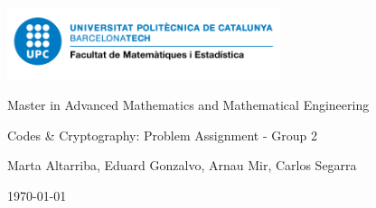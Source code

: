 \documentclass[a4paper, 10pt]{article}
\theoremstyle{definition} %
\begin{document}
\onehalfspacing
\pagestyle{empty}

\begin{center}
    \vspace{2cm}
    \includegraphics[width=8cm]{img/logo_fme.png}
    \vspace{2cm}

    \Large
    Master in Advanced Mathematics and Mathematical Engineering
    \vspace{0.5cm}

    \LARGE
    Codes \& Cryptography: Problem Assignment - Group 2

    \vspace{0.5cm}
    \large
    Marta Altarriba, Eduard Gonzalvo, Arnau Mir, Carlos Segarra

    \vspace{0.5cm}
    \normalsize
    \today

    \vspace{1cm}

\end{center}

\tableofcontents


\newpage
\pagestyle{fancy}

\newpage

\newpage

\newpage

\end{document}
